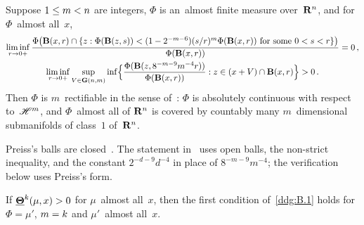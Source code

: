 \documentclass[a4paper,twoside,leqno]{article}
\begin{document}
\begin{theorem}
    \label{ddg:B.1}
    Suppose $1 \le m < n$ are integers, $\Phi$ is an~almost finite measure over~$\mathbf{R}^{n}$,
    and for $\Phi$~almost all~$x$,
    \begin{gather*}
        \liminf_{r \to 0+} \frac{\Phi \bigl( \mathbf{B}(x,r) \cap \{ z : \Phi(\mathbf{B}(z,s)) < (1 -
        2^{-m-6}) (s/r)^m \Phi(\mathbf{B}(x,r)) \text{ for some $0 < s < r$} \} \bigr)}
        {\Phi(\mathbf{B}(x,r))} = 0 \,, \\
        \liminf_{r \to 0+} \sup_{V \in \mathbf{G}(n,m)} \inf \Bigl\{ \frac{\Phi(\mathbf{B}(z,8^{-m-9}
        m^{-4} r))}{\Phi(\mathbf{B}(x,r))} : z \in (x + V) \cap \mathbf{B}(x,r) \Bigr\} > 0 \,.
    \end{gather*}
    Then $\Phi$ is $m$~rectifiable in the sense of~\cite[5.1(1)]{Preiss1987}: $\Phi$ is absolutely
    continuous with respect to~$\mathscr{H}^m$, and $\Phi$~almost all of $\mathbf{R}^{n}$ is covered by
    countably many $m$~dimensional submanifolds of class~$1$ of~$\mathbf{R}^{n}$.
\end{theorem}

\begin{remark}
    \label{rem:B.1}
    Preiss's balls are closed~\cite[1.1]{Preiss1987}. The statement
    in~\cite[Theorem~B.1]{DePhilippis2018} uses open balls, the non-strict inequality, and the
    constant $2^{-d-9} d^{-4}$ in place of $8^{-m-9} m^{-4}$; the verification below uses
    Preiss's form.
\end{remark}

\begin{lemma}[new]
    \label{new:preissA}
    If $\boldsymbol{\underline{\Theta}}^{k}(\mu,x) > 0$ for $\mu$~almost all~$x$, then the first condition
    of~\ref{ddg:B.1} holds for $\Phi = \mu'$, $m = k$ and $\mu'$~almost all~$x$.
\end{lemma}
\end{document}
